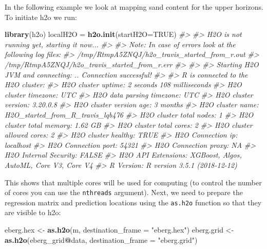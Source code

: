 \documentclass[graybox,natbib,nospthms,UStrade]{svmono}
\newenvironment{Shaded}{\begin{snugshade}}{\end{snugshade}}
\newcommand{\CommentTok}[1]{\textcolor[rgb]{0.37,0.37,0.37}{\textit{#1}}}
\newcommand{\DataTypeTok}[1]{\textcolor[rgb]{0.27,0.27,0.27}{#1}}
\newcommand{\KeywordTok}[1]{\textcolor[rgb]{0.27,0.27,0.27}{\textbf{#1}}}
\newcommand{\NormalTok}[1]{#1}
\newcommand{\OperatorTok}[1]{\textcolor[rgb]{0.43,0.43,0.43}{\textbf{#1}}}
\newcommand{\OtherTok}[1]{\textcolor[rgb]{0.37,0.37,0.37}{#1}}
\newcommand{\StringTok}[1]{\textcolor[rgb]{0.5,0.5,0.5}{#1}}
\begin{document}
In the following example we look at mapping sand content for the upper horizons. To initiate h2o we run:

\begin{Shaded}
\begin{Highlighting}[]
\KeywordTok{library}\NormalTok{(h2o)}
\NormalTok{localH2O =}\StringTok{ }\KeywordTok{h2o.init}\NormalTok{(}\DataTypeTok{startH2O=}\OtherTok{TRUE}\NormalTok{)}
\CommentTok{#> }
\CommentTok{#> H2O is not running yet, starting it now...}
\CommentTok{#> }
\CommentTok{#> Note:  In case of errors look at the following log files:}
\CommentTok{#>     /tmp/RtmpA5ZNQJ/h2o_travis_started_from_r.out}
\CommentTok{#>     /tmp/RtmpA5ZNQJ/h2o_travis_started_from_r.err}
\CommentTok{#> }
\CommentTok{#> }
\CommentTok{#> Starting H2O JVM and connecting: .. Connection successful!}
\CommentTok{#> }
\CommentTok{#> R is connected to the H2O cluster: }
\CommentTok{#>     H2O cluster uptime:         2 seconds 108 milliseconds }
\CommentTok{#>     H2O cluster timezone:       UTC }
\CommentTok{#>     H2O data parsing timezone:  UTC }
\CommentTok{#>     H2O cluster version:        3.20.0.8 }
\CommentTok{#>     H2O cluster version age:    3 months  }
\CommentTok{#>     H2O cluster name:           H2O_started_from_R_travis_lqb476 }
\CommentTok{#>     H2O cluster total nodes:    1 }
\CommentTok{#>     H2O cluster total memory:   1.62 GB }
\CommentTok{#>     H2O cluster total cores:    2 }
\CommentTok{#>     H2O cluster allowed cores:  2 }
\CommentTok{#>     H2O cluster healthy:        TRUE }
\CommentTok{#>     H2O Connection ip:          localhost }
\CommentTok{#>     H2O Connection port:        54321 }
\CommentTok{#>     H2O Connection proxy:       NA }
\CommentTok{#>     H2O Internal Security:      FALSE }
\CommentTok{#>     H2O API Extensions:         XGBoost, Algos, AutoML, Core V3, Core V4 }
\CommentTok{#>     R Version:                  R version 3.5.1 (2018-12-12)}
\end{Highlighting}
\end{Shaded}

This shows that multiple cores will be used for computing (to control the number of cores you can use the \texttt{nthreads} argument). Next, we need to prepare the regression matrix and prediction locations using the \texttt{as.h2o} function so that they are visible to h2o:

\begin{Shaded}
\begin{Highlighting}[]
\NormalTok{eberg.hex <-}\StringTok{ }\KeywordTok{as.h2o}\NormalTok{(m, }\DataTypeTok{destination_frame =} \StringTok{"eberg.hex"}\NormalTok{)}
\NormalTok{eberg.grid <-}\StringTok{ }\KeywordTok{as.h2o}\NormalTok{(eberg_grid}\OperatorTok{@}\NormalTok{data, }\DataTypeTok{destination_frame =} \StringTok{"eberg.grid"}\NormalTok{)}
\end{Highlighting}
\end{Shaded}
\end{document}
